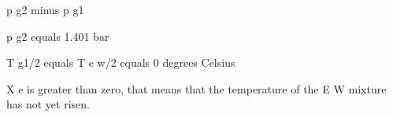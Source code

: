 p g2 minus p g1

p g2 equals 1.401 bar

T g1/2 equals T e w/2 equals 0 degrees Celsius

X e is greater than zero, that means that the temperature of the E W mixture has not yet risen.